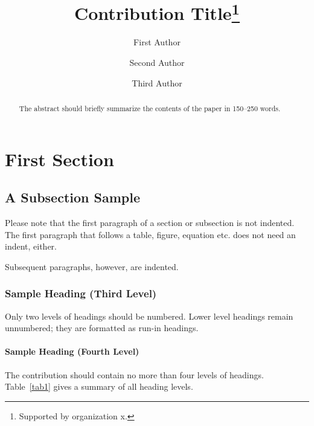 \documentclass[runningheads]{llncs}
\begin{document}
%
\title{Contribution Title\thanks{Supported by organization x.}}
%
%
\author{First Author \and
  Second Author \and
  Third Author}
%
%
%
\maketitle              %
%
\begin{abstract}
  The abstract should briefly summarize the contents of the paper in
  150--250 words.

\end{abstract}
%
%
%
\section{First Section}
\subsection{A Subsection Sample}
Please note that the first paragraph of a section or subsection is
not indented. The first paragraph that follows a table, figure,
equation etc. does not need an indent, either.

Subsequent paragraphs, however, are indented.

\subsubsection{Sample Heading (Third Level)} Only two levels of
headings should be numbered. Lower level headings remain unnumbered;
they are formatted as run-in headings.

\paragraph{Sample Heading (Fourth Level)}
The contribution should contain no more than four levels of
headings. Table~\ref{tab1} gives a summary of all heading levels.
\end{document}
